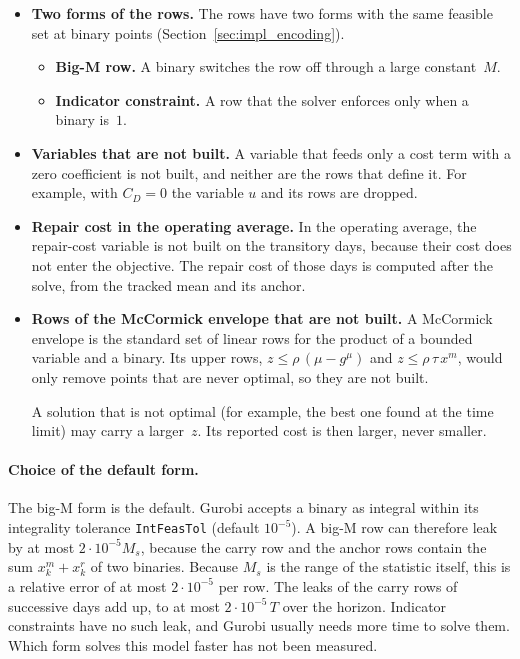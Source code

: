 \documentclass[11pt,a4paper]{article}
\theoremstyle{plain}
\theoremstyle{definition}
\theoremstyle{remark}
\begin{document}
\begin{itemize}
  \item \textbf{Two forms of the rows.}
    The rows have two forms with the same feasible set at binary points (Section~\ref{sec:impl_encoding}).
\begin{itemize}
  \item \textbf{Big-M row.} A binary switches the row off through a large constant~$M$.
  \item \textbf{Indicator constraint.} A row that the solver enforces only when a binary is~$1$.
\end{itemize}
  \item \textbf{Variables that are not built.}
    A variable that feeds only a cost term with a zero coefficient is not built, and neither are the rows that define it.
For example, with $C_D = 0$ the variable $u$ and its rows are dropped.
  \item \textbf{Repair cost in the operating average.}
    In the operating average, the repair-cost variable is not built on the transitory days, because their cost does not enter the objective.
The repair cost of those days is computed after the solve, from the tracked mean and its anchor.
  \item \textbf{Rows of the McCormick envelope that are not built.}
    A McCormick envelope is the standard set of linear rows for the product of a bounded variable and a binary.
Its upper rows, $z \le \rho\,(\mu - g^{\mu})$ and $z \le \rho\,\tau\,x^m$, would only remove points that are never optimal, so they are not built.

A solution that is not optimal (for example, the best one found at the time limit) may carry a larger~$z$.
Its reported cost is then larger, never smaller.
\end{itemize}

\paragraph{Choice of the default form.}
The big-M form is the default.
Gurobi accepts a binary as integral within its integrality tolerance \texttt{IntFeasTol} (default $10^{-5}$).
A big-M row can therefore leak by at most $2 \cdot 10^{-5} M_s$, because the carry row and the anchor rows contain the sum $x^m_k + x^r_k$ of two binaries.
Because $M_s$ is the range of the statistic itself, this is a relative error of at most $2 \cdot 10^{-5}$ per row. The leaks of the carry rows of successive days add up, to at most $2 \cdot 10^{-5}\,T$ over the horizon.
Indicator constraints have no such leak, and Gurobi usually needs more time to solve them.
Which form solves this model faster has not been measured.
\end{document}
